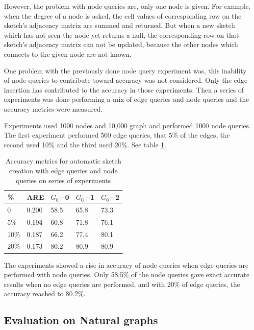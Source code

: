 \documentclass[conference]{IEEEtran}
\begin{document}
However, the problem with node queries are, only one node is given. For example, when the degree of a node is asked, the cell values of corresponding row on the sketch's adjacency matrix are summed and returned. But when a new sketch which has not seen the node yet returns a null, the corresponding row on that sketch's adjacency matrix  can not be updated, because the other nodes which connects to the given node are not known. 


One problem with the previously done node query experiment was, this inability of node queries to contribute toward accuracy was not considered. Only the edge insertion has contributed to the accuracy in those experiments. Then a series of experiments was done performing a mix of edge queries and node queries and the accuracy metrics were measured.


Experiments used 1000 nodes and 10,000 graph and performed 1000 node queries. The first experiment performed 500 edge queries, that 5\% of the edges, the second used 10\% and the third used 20\%. See table \ref{table:Accuracy metrics for automatic sketch creation  with edge queries and node queries on series of experiments}.


\begin{table}[!t]
\caption{Accuracy metrics for automatic sketch creation  with edge queries and node queries on series of experiments}
\label{table:Accuracy metrics for automatic sketch creation  with edge queries and node queries on series of experiments}

\centering
\begin{tabular}{|l|l|l|l|l|}
\hline
\%    & ARE     & $G_0$=0 & $G_0$=1 & $G_0$=2 \\ \hline
0 & 0.200 &   58.5  &  65.8   &   73.3  \\ \hline
5\% & 0.194 & 60.8   & 71.8   & 76.1  \\ \hline
10\% & 0.187 & 66.2   & 77.4   & 80.1   \\ \hline
20\% & 0.173 & 80.2   & 80.9   & 80.9   \\ \hline
\end{tabular}
\end{table}


The experiments showed a rise in accuracy of node queries when edge queries are performed with node queries. Only 58.5\% of the node queries gave exact accurate results when no edge queries are performed, and with 20\% of edge queries, the accuracy reached to 80.2\%.

\subsection{Evaluation on Natural graphs}
\end{document}
